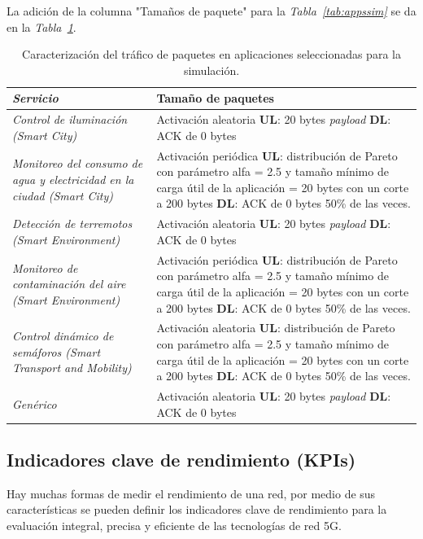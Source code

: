La adición de la columna "Tamaños de paquete"  para la \textit{Tabla~\ref{tab:appssim}} se da en la \textit{Tabla~\ref{tab:trafpkt}}.
\begin{table}
\caption{Caracterización del tráfico de paquetes en aplicaciones seleccionadas para la simulación.}
\label{tab:trafpkt}
\centering
\begin{tabular}{*{2}{m{7cm}}}\\ 
\textbf{\textit{Servicio}} & \textbf{Tamaño de paquetes} \\ \hline \hline
\textit{Control de iluminación (Smart City) } & \footnotesize{ Activación aleatoria \textbf{UL}: 20 bytes \textit{payload} \textbf{DL}: ACK de 0 bytes } \\ \hline 
\textit{Monitoreo del consumo de agua y electricidad en la ciudad (Smart City) } & \footnotesize{ Activación periódica \textbf{UL}: distribución de Pareto con parámetro alfa = 2.5 y tamaño mínimo de carga útil de la aplicación = 20 bytes con un corte a 200 bytes \textbf{DL}: ACK de 0 bytes 50\% de las veces. } \\ \hline 
\textit{Detección de terremotos (Smart Environment)}  & \footnotesize{ Activación aleatoria \textbf{UL}: 20 bytes \textit{payload} \textbf{DL}: ACK de 0 bytes } \\ \hline 
\textit{Monitoreo de contaminación del aire (Smart Environment) } & \footnotesize{ Activación periódica \textbf{UL}: distribución de Pareto con parámetro alfa = 2.5 y tamaño mínimo de carga útil de la aplicación = 20 bytes con un corte a 200 bytes \textbf{DL}: ACK de 0 bytes 50\% de las veces. } \\ \hline 
\textit{Control dinámico de semáforos (Smart Transport and Mobility)}  & \footnotesize{ Activación aleatoria \textbf{UL}: distribución de Pareto con parámetro alfa = 2.5 y tamaño mínimo de carga útil de la aplicación = 20 bytes con un corte a 200 bytes \textbf{DL}: ACK de 0 bytes 50\% de las veces. } \\ \hline 
\textit{Genérico}  & \footnotesize{ Activación aleatoria \textbf{UL}: 20 bytes \textit{payload} \textbf{DL}: ACK de 0 bytes } \\  
\end{tabular}
\end{table}

\subsection{Indicadores clave de rendimiento (KPIs)}

Hay muchas formas de medir el rendimiento de una red, por medio de sus características se pueden definir los indicadores clave de rendimiento para la evaluación integral, precisa y eficiente de las tecnologías de red 5G.\newline

